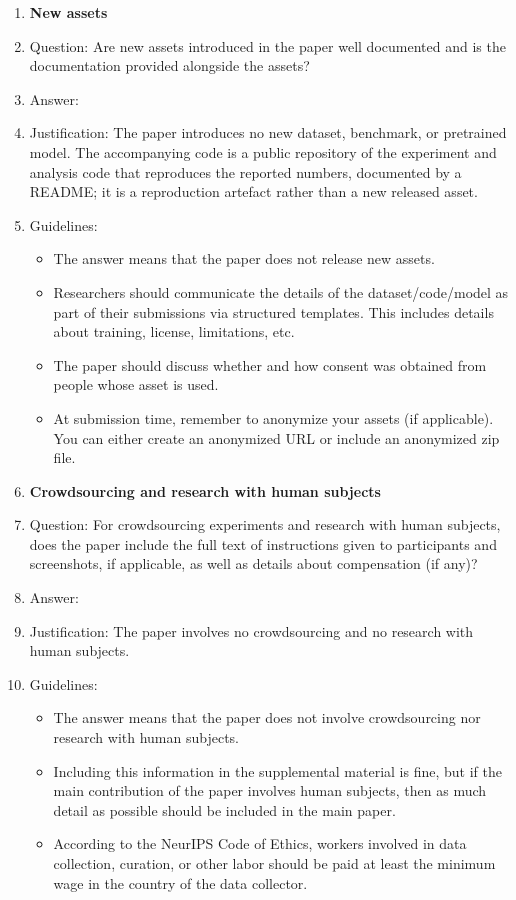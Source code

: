 \begin{enumerate}
\item {\bf New assets}
    \item[] Question: Are new assets introduced in the paper well documented and is the documentation provided alongside the assets?
    \item[] Answer: \answerNA{}
    \item[] Justification: The paper introduces no new dataset, benchmark, or pretrained model. The accompanying
    code is a public repository of the experiment and analysis code that reproduces the
    reported numbers, documented by a README; it is a reproduction artefact rather than a new
    released asset.
    \item[] Guidelines:
    \begin{itemize}
        \item The answer \answerNA{} means that the paper does not release new assets.
        \item Researchers should communicate the details of the dataset\slash code\slash model as part of their submissions via structured templates. This includes details about training, license, limitations, etc. 
        \item The paper should discuss whether and how consent was obtained from people whose asset is used.
        \item At submission time, remember to anonymize your assets (if applicable). You can either create an anonymized URL or include an anonymized zip file.
    \end{itemize}

\item {\bf Crowdsourcing and research with human subjects}
    \item[] Question: For crowdsourcing experiments and research with human subjects, does the paper include the full text of instructions given to participants and screenshots, if applicable, as well as details about compensation (if any)? 
    \item[] Answer: \answerNA{}
    \item[] Justification: The paper involves no crowdsourcing and no research with human subjects.
    \item[] Guidelines:
    \begin{itemize}
        \item The answer \answerNA{} means that the paper does not involve crowdsourcing nor research with human subjects.
        \item Including this information in the supplemental material is fine, but if the main contribution of the paper involves human subjects, then as much detail as possible should be included in the main paper. 
        \item According to the NeurIPS Code of Ethics, workers involved in data collection, curation, or other labor should be paid at least the minimum wage in the country of the data collector. 
    \end{itemize}


\end{enumerate}
